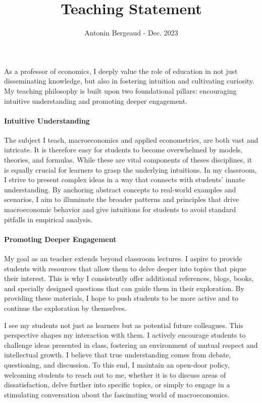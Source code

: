 \documentclass[12pt]{article}
\begin{document}
\title{\textbf{Teaching Statement}}

\date{Antonin Bergeaud - Dec. 2023}

\maketitle


As a professor of economics, I deeply value the role of education in not just disseminating knowledge, but also in fostering intuition and cultivating curiosity. My teaching philosophy is built upon two foundational pillars: encouraging intuitive understanding and promoting deeper engagement.

\paragraph*{Intuitive Understanding} \phantom{;} \newline 
The subject I teach, macroeconomics and applied econometrics, are both vast and intricate. It is therefore easy for students to become overwhelmed by models, theories, and formulas. While these are vital components of theses disciplines, it is equally crucial for learners to grasp the underlying intuitions. In my classroom, I strive to present complex ideas in a way that connects with students' innate understanding. By anchoring abstract concepts to real-world examples and scenarios, I aim to illuminate the broader patterns and principles that drive macroeconomic behavior and give intuitions for students to avoid standard pitfalls in empirical analysis.

\paragraph*{Promoting Deeper Engagement} \phantom{;} \newline
My goal as an teacher extends beyond classroom lectures. I aspire to provide students with resources that allow them to delve deeper into topics that pique their interest. This is why I consistently offer additional references, blogs, books, and specially designed questions that can guide them in their exploration. By providing these materials, I hope to push students to be more active and to continue the exploration by themselves.

I see my students not just as learners but as potential future colleagues. This perspective shapes my interaction with them. I actively encourage students to challenge ideas presented in class, fostering an environment of mutual respect and intellectual growth. I believe that true understanding comes from debate, questioning, and discussion. To this end, I maintain an open-door policy, welcoming students to reach out to me, whether it is to discuss areas of dissatisfaction, delve further into specific topics, or simply to engage in a stimulating conversation about the fascinating world of macroeconomics. \\
\bigskip
\end{document}
